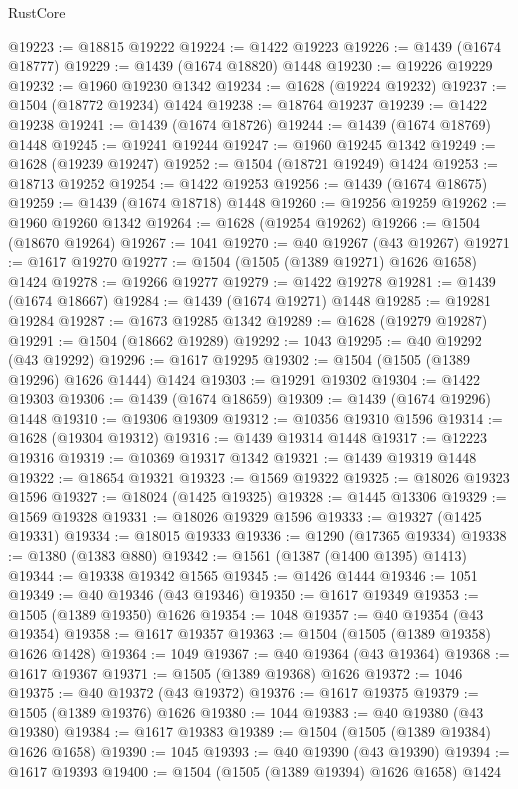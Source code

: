 \begin{lexlean}{RustCore}
\begin{coremodule}
@19223 := @18815 @19222
@19224 := @1422 @19223
@19226 := @1439 (@1674 @18777)
@19229 := @1439 (@1674 @18820) @1448
@19230 := @19226 @19229
@19232 := @1960 @19230 @1342
@19234 := @1628 (@19224 @19232)
@19237 := @1504 (@18772 @19234) @1424
@19238 := @18764 @19237
@19239 := @1422 @19238
@19241 := @1439 (@1674 @18726)
@19244 := @1439 (@1674 @18769) @1448
@19245 := @19241 @19244
@19247 := @1960 @19245 @1342
@19249 := @1628 (@19239 @19247)
@19252 := @1504 (@18721 @19249) @1424
@19253 := @18713 @19252
@19254 := @1422 @19253
@19256 := @1439 (@1674 @18675)
@19259 := @1439 (@1674 @18718) @1448
@19260 := @19256 @19259
@19262 := @1960 @19260 @1342
@19264 := @1628 (@19254 @19262)
@19266 := @1504 (@18670 @19264)
@19267 := 1041
@19270 := @40 @19267 (@43 @19267)
@19271 := @1617 @19270
@19277 := @1504 (@1505 (@1389 @19271) @1626 @1658) @1424
@19278 := @19266 @19277
@19279 := @1422 @19278
@19281 := @1439 (@1674 @18667)
@19284 := @1439 (@1674 @19271) @1448
@19285 := @19281 @19284
@19287 := @1673 @19285 @1342
@19289 := @1628 (@19279 @19287)
@19291 := @1504 (@18662 @19289)
@19292 := 1043
@19295 := @40 @19292 (@43 @19292)
@19296 := @1617 @19295
@19302 := @1504 (@1505 (@1389 @19296) @1626 @1444) @1424
@19303 := @19291 @19302
@19304 := @1422 @19303
@19306 := @1439 (@1674 @18659)
@19309 := @1439 (@1674 @19296) @1448
@19310 := @19306 @19309
@19312 := @10356 @19310 @1596
@19314 := @1628 (@19304 @19312)
@19316 := @1439 @19314 @1448
@19317 := @12223 @19316
@19319 := @10369 @19317 @1342
@19321 := @1439 @19319 @1448
@19322 := @18654 @19321
@19323 := @1569 @19322
@19325 := @18026 @19323 @1596
@19327 := @18024 (@1425 @19325)
@19328 := @1445 @13306
@19329 := @1569 @19328
@19331 := @18026 @19329 @1596
@19333 := @19327 (@1425 @19331)
@19334 := @18015 @19333
@19336 := @1290 (@17365 @19334)
@19338 := @1380 (@1383 @880)
@19342 := @1561 (@1387 (@1400 @1395) @1413)
@19344 := @19338 @19342 @1565
@19345 := @1426 @1444
@19346 := 1051
@19349 := @40 @19346 (@43 @19346)
@19350 := @1617 @19349
@19353 := @1505 (@1389 @19350) @1626
@19354 := 1048
@19357 := @40 @19354 (@43 @19354)
@19358 := @1617 @19357
@19363 := @1504 (@1505 (@1389 @19358) @1626 @1428)
@19364 := 1049
@19367 := @40 @19364 (@43 @19364)
@19368 := @1617 @19367
@19371 := @1505 (@1389 @19368) @1626
@19372 := 1046
@19375 := @40 @19372 (@43 @19372)
@19376 := @1617 @19375
@19379 := @1505 (@1389 @19376) @1626
@19380 := 1044
@19383 := @40 @19380 (@43 @19380)
@19384 := @1617 @19383
@19389 := @1504 (@1505 (@1389 @19384) @1626 @1658)
@19390 := 1045
@19393 := @40 @19390 (@43 @19390)
@19394 := @1617 @19393
@19400 := @1504 (@1505 (@1389 @19394) @1626 @1658) @1424

\end{coremodule}
\end{lexlean}
